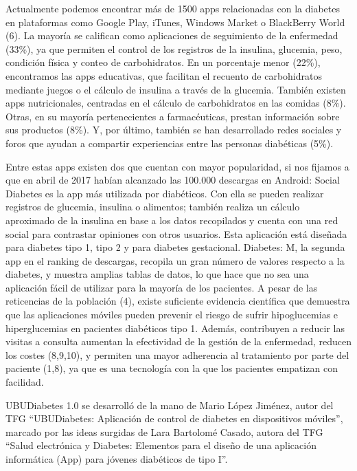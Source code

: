 
Actualmente podemos encontrar más de 1500 apps relacionadas con la diabetes en plataformas como Google Play, iTunes, Windows Market o BlackBerry World (6). La mayoría se califican como aplicaciones de seguimiento de la enfermedad (33\%), ya que permiten el control de los registros de la insulina, glucemia, peso, condición física y conteo de carbohidratos. En un porcentaje menor (22\%), encontramos las apps educativas, que facilitan el recuento de carbohidratos mediante juegos o el cálculo de insulina a través de la glucemia. También existen apps nutricionales, centradas en el cálculo de carbohidratos en las comidas (8\%). Otras, en su mayoría pertenecientes a farmacéuticas, prestan información sobre sus productos (8\%). Y, por último, también se han desarrollado redes sociales y foros que ayudan a compartir experiencias entre las personas diabéticas (5\%).

Entre estas apps existen dos que cuentan con mayor popularidad, si nos fijamos a que en abril de 2017 habían alcanzado las 100.000 descargas en Android: Social Diabetes es la app más utilizada por diabéticos. Con ella se pueden realizar registros de glucemia, insulina o alimentos; también realiza un cálculo aproximado de la insulina en base a los datos recopilados y cuenta con una red social para contrastar opiniones con otros usuarios. Esta aplicación está diseñada para diabetes tipo 1, tipo 2 y para diabetes gestacional. Diabetes: M, la segunda app en el ranking de descargas, recopila un gran número de valores respecto a la diabetes, y muestra amplias tablas de datos, lo que hace que no sea una aplicación fácil de utilizar para la mayoría de los pacientes.
A pesar de las reticencias de la población (4), existe suficiente evidencia científica que demuestra que las aplicaciones móviles pueden prevenir el riesgo de sufrir hipoglucemias e hiperglucemias en pacientes diabéticos tipo 1. Además, contribuyen a reducir las visitas a consulta aumentan la efectividad de la gestión de la enfermedad, reducen los costes (8,9,10), y permiten una mayor adherencia al tratamiento por parte del paciente (1,8), ya que es una tecnología con la que los pacientes empatizan con facilidad\cite{bruno2017}.

UBUDiabetes 1.0 se desarrolló de la mano de Mario López Jiménez, autor del TFG ``UBUDiabetes: Aplicación de control de diabetes en dispositivos móviles'', marcado por las ideas surgidas de Lara Bartolomé Casado, autora del TFG ``Salud electrónica y Diabetes: Elementos para el diseño de una aplicación informática (App) para jóvenes diabéticos de tipo I''.

